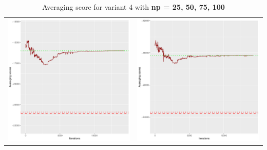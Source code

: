 \documentclass[]{scrartcl}
\begin{document}
\begin{table}[h!]
\begin{tabular}{cc}
\includegraphics[scale = 0.4]{./figs/win95pts/v4/75/avgBoundsEvolution-14252.pdf} & 
\includegraphics[scale = 0.4]{./figs/win95pts/v4/100/avgBoundsEvolution-14252.pdf} \\
\end{tabular}
\caption{Averaging score for variant 4 with \textbf{np =  25, 50, 75, 100 }}
\end{table}
\end{document}
